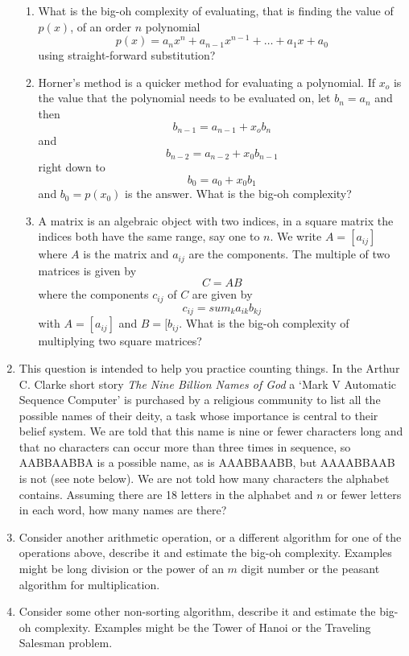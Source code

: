 \documentclass[11pt,a4paper]{scrartcl}
\begin{document}
\begin{enumerate}
\begin{enumerate}
\item What is the big-oh complexity of evaluating, that is finding the
  value of $p(x)$, of an order $n$ polynomial
$$p(x)=a_n x^n +a_{n-1}x^{n-1}+\ldots+a_1x+a_0$$
using straight-forward substitution?
\item Horner's method is a quicker method for evaluating a
  polynomial. If $x_o$ is the value that the polynomial needs to be
  evaluated on, let $b_n=a_n$ and then 
$$ b_{n-1}=a_{n-1}+x_o b_{n}$$
and
$$ b_{n-2}=a_{n-2}+x_0 b_{n-1}$$
right down to 
$$ b_0=a_0+x_0b_1$$ and $b_0=p(x_0)$ is the answer. What is the big-oh
complexity?
\item A matrix is an algebraic object with two indices, in a square
  matrix the indices both have the same range, say one to $n$. We
  write $A=[a_{ij}]$ where $A$ is the matrix and $a_{ij}$ are the
  components. The multiple of two matrices is given by
$$C=AB$$
where the components $c_{ij}$ of $C$ are given by
$$
c_{ij}=sum_{k}a_{ik}b_{kj}
$$ with $A=[a_{ij}]$ and $B=[b_{ij}$. What is the big-oh complexity of
  multiplying two square matrices?




\end{enumerate}

\item This question is intended to help you practice counting
  things. In the Arthur C. Clarke short story \textsl{The Nine Billion
    Names of God} a \lq{}Mark V Automatic Sequence Computer\rq{} is
  purchased by a religious community to list all the possible names of
  their deity, a task whose importance is central to their belief
  system. We are told that this name is nine or fewer characters long
  and that no characters can occur more than three times in sequence,
  so AABBAABBA is a possible name, as is AAABBAABB, but AAAABBAAB is
  not (see note below). We are not told how many characters the
  alphabet contains. Assuming there are 18 letters in the alphabet and
  $n$ or fewer letters in each word, how many names are there?

\item Consider another arithmetic operation, or a different algorithm
  for one of the operations above, describe it and estimate the big-oh
  complexity. Examples might be long division or the power of an $m$
  digit number or the peasant algorithm for multiplication.

\item Consider some other non-sorting algorithm, describe it and
  estimate the big-oh complexity. Examples might be the Tower of Hanoi
  or the Traveling Salesman problem.
\end{enumerate}
\end{document}

